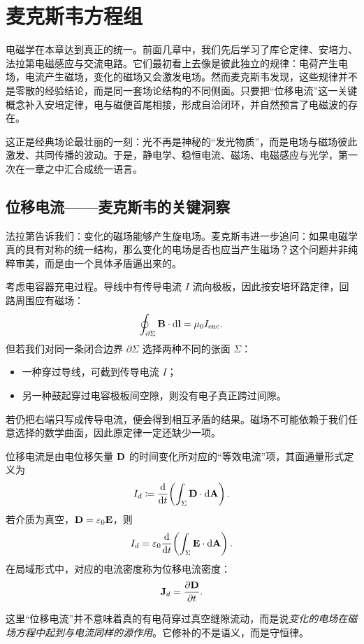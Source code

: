 \chapter{麦克斯韦方程组}

电磁学在本章达到真正的统一。前面几章中，我们先后学习了库仑定律、安培力、法拉第电磁感应与交流电路。它们最初看上去像是彼此独立的规律：电荷产生电场，电流产生磁场，变化的磁场又会激发电场。然而麦克斯韦发现，这些规律并不是零散的经验结论，而是同一套场论结构的不同侧面。只要把“位移电流”这一关键概念补入安培定律，电与磁便首尾相接，形成自洽闭环，并自然预言了电磁波的存在。

这正是经典场论最壮丽的一刻：光不再是神秘的“发光物质”，而是电场与磁场彼此激发、共同传播的波动。于是，静电学、稳恒电流、磁场、电磁感应与光学，第一次在一章之中汇合成统一语言。

\section{位移电流——麦克斯韦的关键洞察}

法拉第告诉我们：变化的磁场能够产生旋电场。麦克斯韦进一步追问：如果电磁学真的具有对称的统一结构，那么变化的电场是否也应当产生磁场？这个问题并非纯粹审美，而是由一个具体矛盾逼出来的。

考虑电容器充电过程。导线中有传导电流 $I$ 流向极板，因此按安培环路定律，回路周围应有磁场：
\[
\oint_{\partial \Sigma} \vb{B}\cdot \dd \vb{l}=\mu_0 I_{\text{enc}}.
\]
但若我们对同一条闭合边界 $\partial \Sigma$ 选择两种不同的张面 $\Sigma$：
\begin{itemize}
  \item 一种穿过导线，可截到传导电流 $I$；
  \item 另一种鼓起穿过电容极板间空隙，则没有电子真正跨过间隙。
\end{itemize}
若仍把右端只写成传导电流，便会得到相互矛盾的结果。磁场不可能依赖于我们任意选择的数学曲面，因此原定律一定还缺少一项。

\begin{definition}[位移电流]
位移电流是由电位移矢量 $\vb{D}$ 的时间变化所对应的“等效电流”项，其面通量形式定义为
\[
I_d\coloneqq \dv{}{t}\!\left(\int_{\Sigma} \vb{D}\cdot \dd \vb{A}\right).
\]
若介质为真空，$\vb{D}=\varepsilon_0\vb{E}$，则
\[
I_d=\varepsilon_0\dv{}{t}\!\left(\int_{\Sigma} \vb{E}\cdot \dd \vb{A}\right).
\]
在局域形式中，对应的电流密度称为位移电流密度：
\[
\vb{J}_d=\pdv{\vb{D}}{t}.
\]
\end{definition}

这里“位移电流”并不意味着真的有电荷穿过真空缝隙流动，而是说\emph{变化的电场在磁场方程中起到与电流同样的源作用}。它修补的不是语义，而是守恒律。

